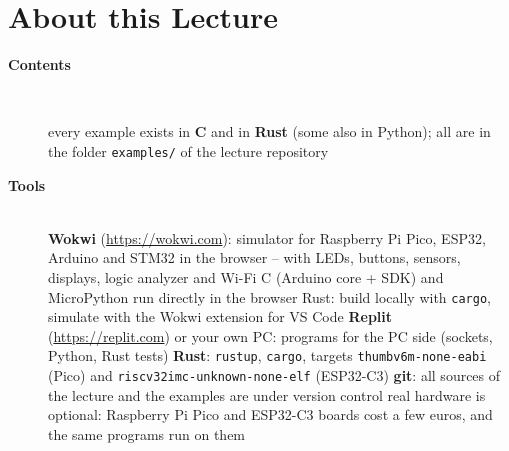 \section{About this Lecture}
\begin{description}
\item[{\rot\bf Contents}]~\\[-\lblskip]
\begin{center}
\end{center}
\bi
	\ite every example exists in \textbf{C} and in \textbf{Rust} (some also in Python); all are in the folder \texttt{examples/} of the lecture repository
\ei
\os{\newpage}

\item[{\rot\bf Tools}]~\\[-\lblskip]
\bi
	\ite \textbf{Wokwi} (\url{https://wokwi.com}): simulator for Raspberry Pi Pico, ESP32, Arduino and STM32 in the browser -- with LEDs, buttons, sensors, displays, logic analyzer and Wi-Fi
	\bi
		\ite C (Arduino core + SDK) and MicroPython run directly in the browser
		\ite Rust: build locally with \texttt{cargo}, simulate with the Wokwi extension for VS Code
	\ei
	\ite \textbf{Replit} (\url{https://replit.com}) or your own PC: programs for the PC side (sockets, Python, Rust tests)
	\ite \textbf{Rust}: \texttt{rustup}, \texttt{cargo}, targets \texttt{thumbv6m-none-eabi} (Pico) and \texttt{riscv32imc-unknown-none-elf} (ESP32-C3)
	\ite \textbf{git}: all sources of the lecture and the examples are under version control
	\ite real hardware is optional: Raspberry Pi Pico and ESP32-C3 boards cost a few euros, and the same programs run on them
\ei
\os{\newpage}


\end{description}
